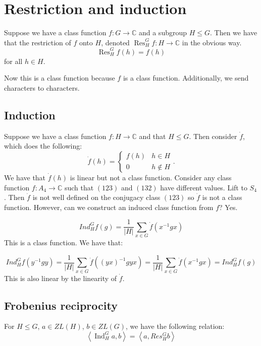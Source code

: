 \documentclass[]{report}
\theoremstyle{definition}
\numberwithin{theorem}{section}
\numberwithin{equation}{section}
\newcommand{\res}{\operatorname{Res}}
\newcommand{\ind}{\operatorname{Ind}}
\begin{document}
\section{Restriction and induction}

Suppose we have a class function $f: G \rightarrow \mathbb{C}$ and a subgroup $H \leq G$. Then we have that the restriction of $f$ onto $H$, denoted $\res^G_H f : H \rightarrow \mathbb{C}$ in the obvious way. 
\begin{equation}
	\res^G_H f(h) = f(h)
\end{equation}
for all $h \in H$. 

Now this is a class function because $f$ is a class function. Additionally, we send characters to characters. 
\subsection{Induction}
Suppose we have a class function $f: H \rightarrow \mathbb{C}$ and that $H \leq G$. Then consider $\dot{f}$, which does the following:
\begin{equation}
	\dot{f}(h) =
	\begin{cases}
		f(h) & h \in H\\
		0 & h \notin H
	\end{cases}.
\end{equation}
We have that $\dot{f}(h)$ is linear but not a class function.
Consider any class function $f: A_4 \rightarrow \mathbb{C}$ such that $(123)$ and $(132)$ have different values. Lift to $S_4$. Then $\dot{f}$ is not well defined on the conjugacy class $(123)$ so $\dot{f}$ is not a class function.
However, can we construct an induced class function from $f$? Yes. 

\begin{equation}
	Ind^G_H f(g) = \frac{1}{|H|} \sum_{x \in G} \dot{f}(x^{-1} g x)
\end{equation}
This is a class function. We have that:

\begin{equation}
	Ind^G_H f(y^{-1}g y) = \frac{1}{|H|} \sum_{x \in G} \dot{f}((yx)^{-1} g yx) = \frac{1}{|H|} \sum_{x \in G} \dot{f}(x^{-1} g x) = Ind^G_H f(g) 
\end{equation}
This is also linear by the linearity of $\dot{f}$. 

\subsection{Frobenius reciprocity}
For $H \leq G$, $a \in ZL(H)$, $b \in ZL(G)$, we have the following relation:
\begin{equation}
	\left\langle \ind^G_H a ,b \right\rangle = \left\langle a , Res^G_H b \right\rangle 
\end{equation}
\end{document}
